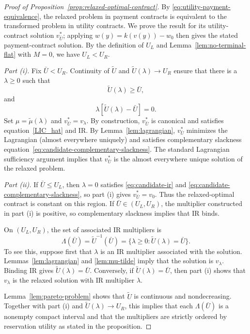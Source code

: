 \begin{proof}[Proof of Proposition~\ref{prop:relaxed-optimal-contract}]
By \eqref{eq:utility-payment-equivalence}, the relaxed problem in payment
contracts is equivalent to the transformed problem in utility contracts.  We
prove the result for its utility-contract solution $v^*_{\bar U}$; applying
$w(y)=k(v(y))-w_0$ then gives the stated payment-contract solution.  By the
definition of $U_L$ and Lemma~\ref{lem:no-terminal-flat} with $M=0$, we have
$U_L<U_R$.

\emph{Part (i).}  Fix $\bar U<U_R$.  Continuity of $\widetilde U$ and
$\widetilde U(\lambda)\to U_R$ ensure that there is a $\lambda\geq0$ such that
\begin{equation}
    \widetilde U(\lambda)\geq\bar U,
    \label{eq:candidate-ir}
\end{equation}
and
\begin{equation}
    \lambda[\widetilde U(\lambda)-\bar U]=0.
    \label{eq:candidate-complementary-slackness}
\end{equation}
Set $\mu=\widetilde\mu(\lambda)$ and
$v^*_{\bar U}=v_\lambda$.  By construction, $v^*_{\bar U}$ is canonical and
satisfies equation~\eqref{LIC_hat} and IR.  By Lemma~\ref{lem:lagrangian}, $v^*_{\bar U}$ minimizes the Lagrangian (almost everywhere uniquely) and satisfies complementary slackness equation~\eqref{eq:candidate-complementary-slackness}. The
standard Lagrangian sufficiency argument implies that $v^*_{\bar U}$ is the almost
everywhere unique solution of the relaxed problem.

\emph{Part (ii).}  If $\bar U\leq U_L$, then $\lambda=0$ satisfies
\eqref{eq:candidate-ir} and
\eqref{eq:candidate-complementary-slackness}, so part (i) gives
$v^*_{\bar U}=v_0$.  Thus the relaxed-optimal contract is constant on this
region.  If $\bar U\in(U_L,U_R)$, the multiplier constructed in part (i) is
positive, so complementary slackness implies that IR binds.

On $(U_L,U_R)$, the set of associated IR multipliers is
\[
    \Lambda(\bar U)
    =\widetilde U^{-1}(\bar U)
    =\{\lambda\geq0:\widetilde U(\lambda)=\bar U\}.
\]
To see this, suppose first that $\lambda$ is an IR multiplier associated with
the solution.  Lemmas~\ref{lem:lagrangian} and \ref{lem:mu-tilde} imply that
the solution is $v_\lambda$.  Binding IR gives
$\widetilde U(\lambda)=\bar U$.  Conversely, if
$\widetilde U(\lambda)=\bar U$, then part (i) shows that $v_\lambda$ is the
relaxed solution with IR multiplier $\lambda$.

Lemma~\ref{lem:pareto-problem} shows that $\widetilde U$ is continuous and
nondecreasing.  Together with part (i) and
$\widetilde U(\lambda)\to U_R$, this implies that each $\Lambda(\bar U)$ is a
nonempty compact interval and that the multipliers are strictly ordered by
reservation utility as stated in the proposition.


\end{proof}
